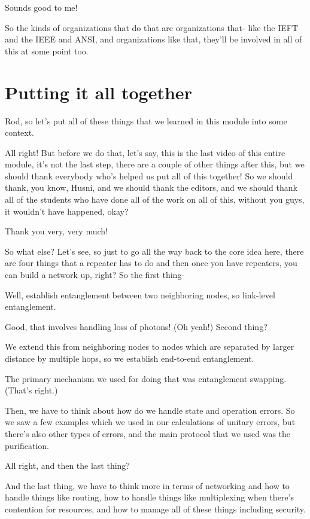 Sounds good to me!

So the kinds of organizations that do that are organizations that- like the IEFT and the IEEE and ANSI, and organizations like that, they'll be involved in all of this at some point too.


\section{Putting it all together}


Rod, so let's put all of these things that we learned in this module into some context.

All right! But before we do that, let's say, this is the last video of this entire module, it's not the last step, there are a couple of other things after this, but we should thank everybody who's helped us put all of this together! So we should thank, you know, Husni, and we should thank the editors, and we should thank all of the students who have done all of the work on all of this, without you guys, it wouldn't have happened, okay?

Thank you very, very much!

So what else? Let's see, so just to go all the way back to the core idea here, there are four things that a repeater has to do and then once you have repeaters, you can build a network up, right? So the first thing-

Well, establish entanglement between two neighboring nodes, so link-level entanglement.

Good, that involves handling loss of photons! (Oh yeah!) Second thing?

We extend this from neighboring nodes to nodes which are separated by larger distance by multiple hops, so we establish end-to-end entanglement.

The primary mechanism we used for doing that was entanglement swapping. (That's right.)

Then, we have to think about how do we handle state and operation errors. So we saw a few examples which we used in our calculations of unitary errors, but there's also other types of errors, and the main protocol that we used was the purification.

All right, and then the last thing?

And the last thing, we have to think more in terms of networking and how to handle things like routing, how to handle things like multiplexing when there's contention for resources, and how to manage all of these things including security.

